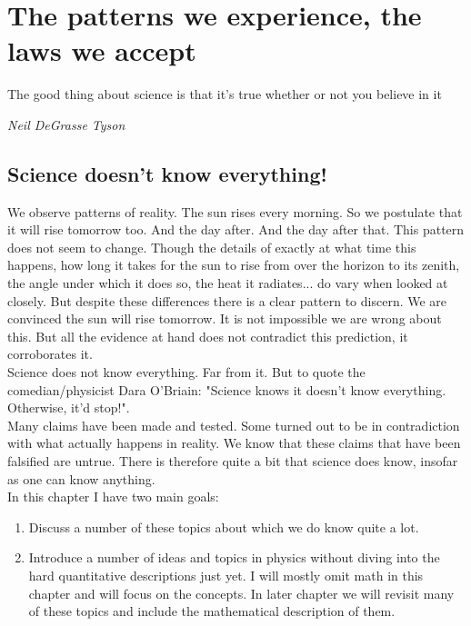 \chapter{The patterns we experience, the laws we accept}
\label{Intro_Physics}

\epigraph{The good thing about science is that it's true whether or not you believe in it}{\textit{ Neil DeGrasse Tyson}}

\section{Science doesn't know everything!}

\noindent We observe patterns of reality. The sun rises every morning. So we postulate that it will rise tomorrow too. And the day after. And the day after that. This pattern does not seem to change. Though the details of exactly at what time this happens, how long it takes for the sun to rise from over the horizon to its zenith, the angle under which it does so, the heat it radiates... do vary when looked at closely. But despite these differences there is a clear pattern to discern. We are convinced the sun will rise tomorrow. It is not impossible we are wrong about this. But all the evidence at hand does not contradict this prediction, it corroborates it.\\

\noindent Science does not know everything. Far from it. But to quote the comedian/physicist Dara O'Briain: "Science knows it doesn't know everything. Otherwise, it'd stop!".\\

\noindent Many claims have been made and tested. Some turned out to be in contradiction with what actually happens in reality. We know that these claims that have been falsified are untrue. There is therefore quite a bit that science does know, insofar as one can know anything.\\ 

\noindent In this chapter I have two main goals:
\begin{enumerate}
\item Discuss a number of these topics about which we do know quite a lot. 
\item Introduce a number of ideas and topics in physics without diving into the hard quantitative descriptions just yet. I will mostly omit math in this chapter and will focus on the concepts. In later chapter we will revisit many of these topics and include the mathematical description of them.
\end{enumerate}

